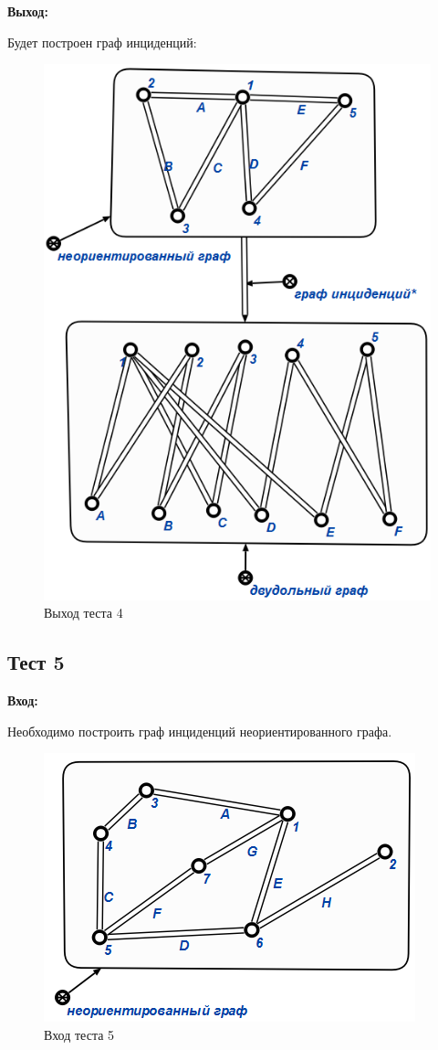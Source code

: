 \textbf{Выход:}

Будет построен граф инциденций:

\begin{figure}[H]
  \centering
  \includegraphics[scale=0.7]{images/20.png}
  \caption{Выход теста 4}
\end{figure}

\subsection{Тест 5}

\textbf{Вход:}

Необходимо построить граф инциденций неориентированного графа.

\begin{figure}[H]
  \centering
  \includegraphics[scale=0.7]{images/21.png}
  \caption{Вход теста 5}
\end{figure}


